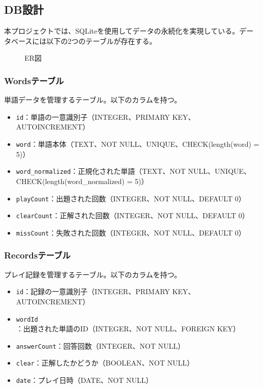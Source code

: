 \documentclass[a4j]{ujarticle}
\begin{document}
\subsection{DB設計}
本プロジェクトでは、SQLiteを使用してデータの永続化を実現している。データベースには以下の2つのテーブルが存在する。

\begin{figure}[h]
\centering
\caption{ER図}
\label{fig:er}
\end{figure}

\subsubsection{Wordsテーブル}
単語データを管理するテーブル。以下のカラムを持つ。
\begin{itemize}
  \item \texttt{id}：単語の一意識別子（INTEGER、PRIMARY KEY、AUTOINCREMENT）
  \item \texttt{word}：単語本体（TEXT、NOT NULL、UNIQUE、CHECK(length(word) = 5)）
  \item \texttt{word\_normalized}：正規化された単語（TEXT、NOT NULL、UNIQUE、CHECK(length(word\_normalized) = 5)）
  \item \texttt{playCount}：出題された回数（INTEGER、NOT NULL、DEFAULT 0）
  \item \texttt{clearCount}：正解された回数（INTEGER、NOT NULL、DEFAULT 0）
  \item \texttt{missCount}：失敗された回数（INTEGER、NOT NULL、DEFAULT 0）
\end{itemize}

\subsubsection{Recordsテーブル}
プレイ記録を管理するテーブル。以下のカラムを持つ。
\begin{itemize}
  \item \texttt{id}：記録の一意識別子（INTEGER、PRIMARY KEY、AUTOINCREMENT）
  \item \texttt{wordId}：出題された単語のID（INTEGER、NOT NULL、FOREIGN KEY）
  \item \texttt{answerCount}：回答回数（INTEGER、NOT NULL）
  \item \texttt{clear}：正解したかどうか（BOOLEAN、NOT NULL）
  \item \texttt{date}：プレイ日時（DATE、NOT NULL）
\end{itemize}
\end{document}
